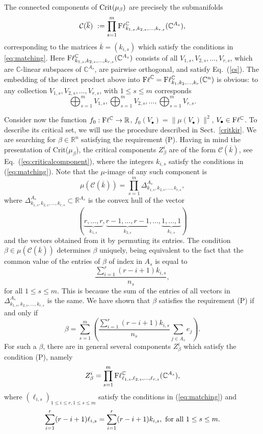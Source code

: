 \documentclass[12pt]{amsart}
\theoremstyle{definition}
\theoremstyle{remark}
\newcommand{\RR}{\mathbb R}
\newcommand{\CC}{\mathbb C}
\newcommand{\Fl}{{\mathrm{F\ell}}}
\begin{document}
The connected components of  ${\rm Crit}(\mu_\beta)$ are precisely the submanifolds
\begin{equation}
\mathcal{C}(\overline{k}) \
:= \prod_{s=1}^m {\rm F}\ell^\CC_{k_{1,s}, k_{2,s}, \ldots, k_{r,s}}(\CC^{A_s}),
\label{eq:criticalcomponent}
\end{equation}
corresponding to the matrices $\overline{k}=(k_{i,s})$ which satisfy the conditions in \eqref{eq:matching}.
Here $ {\rm F}\ell^\CC_{k_{1,s}, k_{2,s}, \ldots, k_{r,s}}(\CC^{A_s})$ consists of all $V_{1,s}, V_{2,s}, \ldots, V_{r,s}$, which are $\CC$-linear subspaces of $\CC^{A_s}$, are pairwise orthogonal, and satisfy Eq.~(\ref{cs}). 
The embedding of the direct product above into $\Fl^\CC={\rm F}\ell^\CC_{k_{1}, k_{2}, \ldots, k_{r}}(\CC^{n})$ is obvious: to any
collection $V_{1,s}, V_{2,s}, \ldots, V_{r,s}$, with $1\le s \le m$ corresponds
$$\bigoplus_{s=1}^m V_{1,s}, \bigoplus_{s=1}^m V_{2,s}, \ldots , \bigoplus_{s=1}^m V_{r,s}.$$


Consider now the function $f_0 : {\rm F}\ell^\CC \to {\mathbb R}$, $f_0(V_\bullet)=\|\mu(V_\bullet)\|^2$, $V_\bullet \in {\rm F}\ell^\CC$. To describe its critical set, we will use the procedure described in Sect.~\ref{critkir}.  We are searching for $\beta \in \RR^n$ satisfying the requirement (P). Having in mind the presentation of Crit($\mu_\beta$), the 
critical components $Z_\beta^i$ are of the form $\mathcal{C}(\overline{k})$, see Eq.~(\ref{eq:criticalcomponent}), 
where the integers $k_{i,s}$ satisfy the conditions in (\ref{eq:matching}). 
Note that the  $\mu$-image of any such component is
$$\mu(\mathcal{C}(\overline{k})) = \prod_{s=1}^m \Delta^{A_s}_{k_{1,s}, k_{2,s}, \ldots, k_{r,s}},$$
where $\Delta^{A_s}_{k_{1,s}, k_{2,s}, \ldots, k_{r,s}} \subset \RR^{A_s}$ is the convex hull of the vector
$$(\underbrace{r, \dots, r}_{k_{1,s}},
\underbrace{r-1, \dots, r-1}_{k_{2,s}},
\dots,
\underbrace{1, \dots, 1}_{k_{r,s}})$$
and the vectors obtained from it by permuting its entries. 
The condition $\beta \in \mu({\mathcal C}(\overline{k}))$ determines $\beta$ uniquely, being equivalent to the fact that the common value of the entries of $\beta$ of index in $A_s$ is equal to
$$\frac{\sum_{i=1}^r(r-i+1) k_{i, s}}{n_s},$$
for all $1\le s\le m$. 
This is because the sum of the entries of all vectors in $\Delta^{A_s}_{k_{1,s}, k_{2,s}, \ldots, k_{r,s}} $ is the same. 
We have shown that  $\beta$ satisfies the requirement (P) if and only if 
$$\beta=\sum_{s=1}^m\left(\frac{\sum_{i=1}^r(r-i+1) k_{i, s}}{n_s}\sum_{j\in A_s} e_j \right).$$
For such a $\beta$, there are in general several components $Z_\beta^i$ which satisfy the condition (P), namely
$$Z_\beta^i= \prod_{s=1}^m {\rm F}\ell^\CC_{\ell_{1,s}, \ell_{2,s}, \ldots, \ell_{r,s}}(\CC^{A_s}),$$
where  $(\ell_{i,s})_{1\le i \le r, 1\le s\le m}$ satisfy the conditions in (\ref{eq:matching}) and 
$${\sum_{i=1}^r (r-i+1)\ell_{i, s}}={\sum_{i=1}^r(r-i+1)k_{i, s}}, \ {\rm for \ all} \ 1\le s \le m.$$
\end{document}
